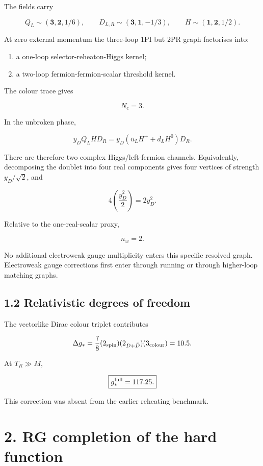 \documentclass[
  10pt,
]{article}
\providecommand{\tightlist}{%
  \setlength{\itemsep}{0pt}\setlength{\parskip}{0pt}}
\begin{document}
The fields carry

\[
Q_L\sim(\mathbf3,\mathbf2,1/6),
\qquad
D_{L,R}\sim(\mathbf3,\mathbf1,-1/3),
\qquad
H\sim(\mathbf1,\mathbf2,1/2).
\]

At zero external momentum the three-loop 1PI but 2PR graph factorises
into:

\begin{enumerate}
\def\labelenumi{\arabic{enumi}.}
\tightlist
\item
  a one-loop selector-reheaton-Higgs kernel;
\item
  a two-loop fermion-fermion-scalar threshold kernel.
\end{enumerate}

The colour trace gives

\[
N_c=3.
\]

In the unbroken phase,

\[
y_D\overline Q_L H D_R
=
y_D\left(\overline u_LH^++\overline d_LH^0\right)D_R.
\]

There are therefore two complex Higgs/left-fermion channels.
Equivalently, decomposing the doublet into four real components gives
four vertices of strength \(y_D/\sqrt2\), and

\[
4\left(\frac{y_D^2}{2}\right)=2y_D^2.
\]

Relative to the one-real-scalar proxy,

\[
\boxed{n_w=2.}
\]

No additional electroweak gauge multiplicity enters this specific
resolved graph. Electroweak gauge corrections first enter through
running or through higher-loop matching graphs.

\subsection{1.2 Relativistic degrees of
freedom}\label{relativistic-degrees-of-freedom}

The vectorlike Dirac colour triplet contributes

\[
\Delta g_*
=\frac78(2_{\rm spin})(2_{D+\bar D})(3_{\rm colour})
=10.5.
\]

At \(T_R\gg M\),

\[
\boxed{g_*^{\rm full}=117.25.}
\]

This correction was absent from the earlier reheating benchmark.

\section{2. RG completion of the hard
function}\label{rg-completion-of-the-hard-function}
\end{document}
